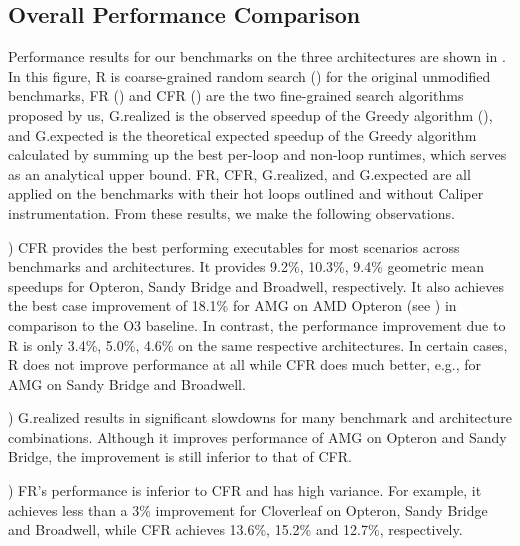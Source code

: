 
\subsection{Overall Performance Comparison} \label{overallResults}

Performance results for our benchmarks on the three
architectures are shown in . In this figure, R is coarse-grained
random search () for the original unmodified benchmarks,
FR () and CFR () are the two fine-grained search
algorithms proposed by us, G.realized is the observed speedup of
the Greedy algorithm (), and G.expected is the
theoretical expected speedup of the Greedy algorithm calculated by
summing up the best per-loop and non-loop runtimes, which serves as
an analytical upper bound. FR, CFR, G.realized, and G.expected are all
applied on the benchmarks with their hot loops outlined and without Caliper
instrumentation.
From these results, we make the following observations.

\vspace{.25em}
) CFR provides the best performing executables for most
scenarios across benchmarks and architectures. It provides 9.2\%,
10.3\%, 9.4\% geometric mean speedups for Opteron, Sandy
Bridge and Broadwell, respectively.  It also achieves the best case
improvement of 18.1\% for AMG on AMD Opteron (see ) in
comparison to the O3 baseline.  In contrast, the performance
improvement due to R is only 3.4\%, 5.0\%, 4.6\% on the same
respective architectures.  In certain cases, R does not improve performance at all
while CFR does much better, e.g., for AMG on Sandy Bridge and
Broadwell.

\vspace{.25em}
) G.realized results in significant slowdowns for many benchmark and
architecture combinations.  Although it improves performance of AMG on
Opteron and Sandy Bridge, the improvement is still inferior to that of
CFR.

\vspace{.25em}
) FR's performance is inferior to CFR and has high
variance.  For example, it achieves less than a 3\% improvement for
Cloverleaf on Opteron, Sandy Bridge and Broadwell, while CFR achieves
13.6\%, 15.2\% and 12.7\%, respectively.

